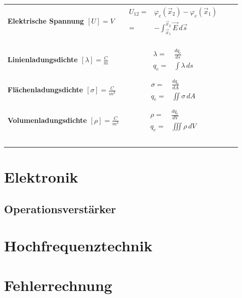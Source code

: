 \documentclass[a4paper]{article}
\begin{document}
\begin{table}[h]
{\begin{tabular}{@{}>{\bfseries}lccc@{}}
\makecell[l]{Elektrische Spannung \\ $\displaystyle[U] = V$}
	& $\displaystyle\begin{aligned}
		U_{12} = & \varphi_e(\vec{x}_2) - \varphi_e(\vec{x}_1) \\
		= & - \int_{\vec{x}_1}^{\vec{x}_2} \vec{E}\, d\vec{s}
	\end{aligned}$
	& 
	&\\ \\
	 
\midrule \\ \\
	
\makecell[l]{Linienladungsdichte \\ $[\lambda] = \frac{C}{m}$}
	& $\displaystyle\begin{aligned}
		\lambda = & \frac{dq_e}{ds} \\
		q_e = & \int \lambda\,ds
	\end{aligned}$ 
	&\\ \\
	
\makecell[l]{Flächenladungsdichte \\ $[\sigma] = \frac{C}{m^2}$}
	& $\displaystyle\begin{aligned}
		\sigma = & \frac{dq_e}{dA} \\
		q_e = & \iint \sigma\,dA
	\end{aligned}$ 
	&\\ \\
	
\makecell[l]{Volumenladungsdichte \\ $[\rho] = \frac{C}{m^3}$}
	& $\displaystyle\begin{aligned}
		\rho = & \frac{dq_e}{dV} \\
		q_e = & \iiint \rho\,dV
	\end{aligned}$ 
	&\\ \\

\bottomrule

\label{tab:Elektrostatik}
\end{tabular}
}
\end{table}

\newpage
\section{Elektronik}

\subsection{Operationsverstärker}

\section{Hochfrequenztechnik}

\section{Fehlerrechnung}

\newpage
\printbibliography
\end{document}
